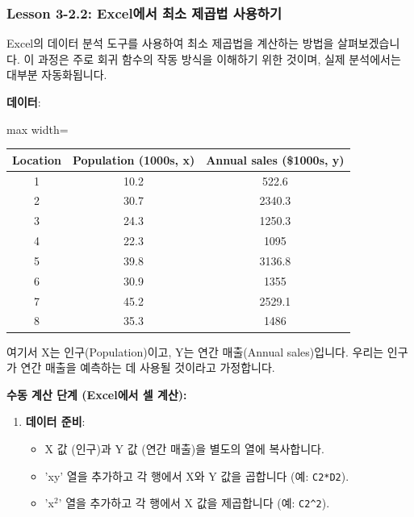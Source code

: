 \documentclass[11pt,a4paper]{article}
\theoremstyle{definition}
\begin{document}
\newpage
\subsubsection{Lesson 3-2.2: Excel에서 최소 제곱법 사용하기}

Excel의 데이터 분석 도구를 사용하여 최소 제곱법을 계산하는 방법을 살펴보겠습니다. 이 과정은 주로 회귀 함수의 작동 방식을 이해하기 위한 것이며, 실제 분석에서는 대부분 자동화됩니다.

\begin{tcolorbox}[examplebox, title=Excel 실습: 인구 및 매출 데이터]
\textbf{데이터}:
\begin{adjustbox}{max width=\textwidth}
\begin{tabular}{ccc}
\toprule
\textbf{Location} & \textbf{Population (1000s, x)} & \textbf{Annual sales (\$1000s, y)} \\
\midrule
1 & 10.2 & 522.6 \\
2 & 30.7 & 2340.3 \\
3 & 24.3 & 1250.3 \\
4 & 22.3 & 1095 \\
5 & 39.8 & 3136.8 \\
6 & 30.9 & 1355 \\
7 & 45.2 & 2529.1 \\
8 & 35.3 & 1486 \\
\bottomrule
\end{tabular}
\end{adjustbox}
여기서 X는 인구(Population)이고, Y는 연간 매출(Annual sales)입니다. 우리는 인구가 연간 매출을 예측하는 데 사용될 것이라고 가정합니다.

\textbf{수동 계산 단계 (Excel에서 셀 계산):}
\begin{enumerate}[label=\arabic*.]
    \item \textbf{데이터 준비}:
    \begin{itemize}
        \item X 값 (인구)과 Y 값 (연간 매출)을 별도의 열에 복사합니다.
        \item 'xy' 열을 추가하고 각 행에서 X와 Y 값을 곱합니다 (예: \texttt{C2*D2}).
        \item 'x$^2$' 열을 추가하고 각 행에서 X 값을 제곱합니다 (예: \texttt{C2^2}).
    \end{itemize}


\end{enumerate}
\end{tcolorbox}
\end{document}
